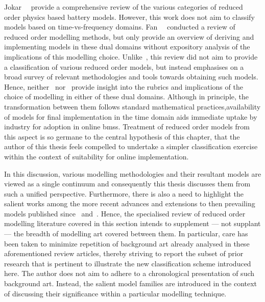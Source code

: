 
Jokar~\etal~\cite{Jokar2016}  provide  a  comprehensive review  of  the  various
categories  of  reduced  order  physics  based  battery  models.  However,  this
work  does  not aim  to  classify  models  based on  time-vs-frequency  domains.
Fan~\etal{}~\cite{Fan2015}  conducted  a  review   of  reduced  order  modelling
methods, but  only provide an  overview of  deriving and implementing  models in
these  dual domains  without expository  analysis  of the  implications of  this
modelling choice. Unlike~\cite{Jokar2016}, this review  did not aim to provide a
classification  of various  reduced order  models, but  instead emphasises  on a
broad survey of relevant methodologies  and tools towards obtaining such models.
Hence,  neither~\cite{Jokar2016}  nor~\cite{Fan2015}  provide insight  into  the
rubrics and  implications of  the choice  of modelling in  either of  these dual
domains. Although in principle, the transformation between them follows standard
mathematical  practices,availability  of  models  for
final implementation  in the time domain  aids immediate uptake by  industry for
adoption  in online  \gls{bms}s. Treatment  of  reduced order  models from  this
aspect  is so  germane to  the central  hypothesis of  this chapter, that  the author  of this  thesis feels
compelled to undertake  a simpler classification exercise within  the context of
suitability for online implementation.


In this discussion,  various modelling methodologies and  their resultant models
are viewed  as a single  continuum and  consequently this thesis  discusses them
from such a unified perspective. Furthermore,  there is also a need to highlight
the  salient  works among  the  more  recent  advances  and extensions  to  then
prevailing  models published  since~\cite{Jokar2016} and~\cite{Fan2015}.  Hence,
the specialised  review of  reduced order modelling  literature covered  in this
section intends to supplement --- not  supplant --- the breadth of modelling art
covered between them. In particular, care  has been taken to minimize repetition
of  background art  already analysed  in these  aforementioned review  articles,
thereby striving  to report the  subset of prior  research that is  pertinent to
illustrate the  new classification scheme  introduced here. The author  does not
aim to adhere  to a chronological presentation of such  background art. Instead,
the salient  model families are  introduced in  the context of  discussing their
significance within a particular modelling technique.



